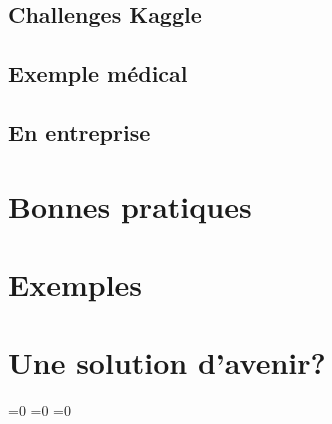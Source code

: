 \documentclass[11pt,a4paper]{article}
\begin{document}
\subsection{Challenges Kaggle}
\subsection{Exemple médical}
\subsection{En entreprise}

\section{Bonnes pratiques}

\section{Exemples}






\section{Une solution d'avenir?}




%
%

\makeatletter
\ifnum{}=0
\clearpage
\else\ifnum{}=0
\clearpage
\else\ifnum{}=0
\clearpage
\fi\fi\fi

\end{document}
